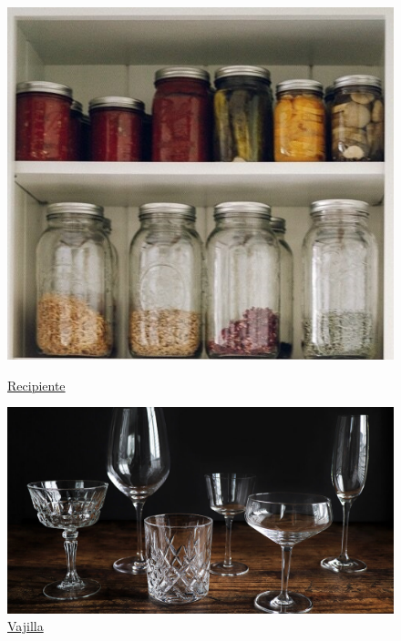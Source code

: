 \begin{figure}[htbp]
    \centering
    \begin{minipage}[b]{0.4\textwidth}
        \centering
        \includegraphics[width=\linewidth]{../Ejercicio-2/ImagenesEjercicio2/containerGlass.jpg}
        \caption{\href{https://thewellco.co/glass-food-storage-jars}{Recipiente}}	
        \label{fig:pic3}
    \end{minipage}
    \hfill
    \begin{minipage}[b]{0.4\textwidth}
        \centering
        \includegraphics[width=\linewidth]{../Ejercicio-2/ImagenesEjercicio2/tablewareGlass.jpg}
        \caption{\href{https://casualmixologist.com/guides/mixology-basics/glassware-explained}{Vajilla}}	
        \label{fig:pic4}
    \end{minipage}
\end{figure}
